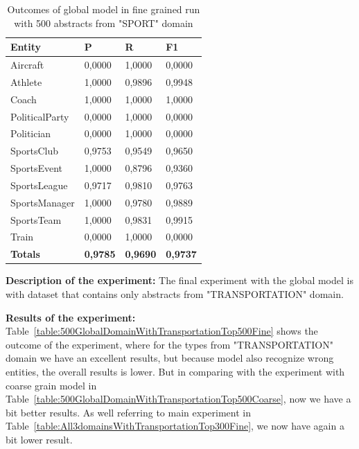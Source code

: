 \documentclass[thesis=M,english]{FITthesis}[2018/05/30]
\begin{document}
	\begin{table}[H]\centering
		\begin{tabular}{|l|l|l|l|}
			\hline {\textbf{Entity}} & {\textbf{P}} & {\textbf{R}} & {\textbf{F1}}\\\hline
				Aircraft & 0,0000 & 1,0000 & 0,0000\\
				Athlete & 1,0000 & 0,9896 & 0,9948\\
				Coach & 1,0000 & 1,0000 & 1,0000\\
				PoliticalParty & 0,0000 & 1,0000 & 0,0000\\
				Politician & 0,0000 & 1,0000 & 0,0000\\
				SportsClub & 0,9753 & 0,9549 & 0,9650\\
				SportsEvent & 1,0000 & 0,8796 & 0,9360\\
				SportsLeague & 0,9717 & 0,9810 & 0,9763\\
				SportsManager & 1,0000 & 0,9780 & 0,9889\\				
				SportsTeam & 1,0000 & 0,9831 & 0,9915\\
				Train & 0,0000 & 1,0000 & 0,0000\\\hline
				\textbf{Totals} & \textbf{0,9785} & \textbf{0,9690} & \textbf{0,9737}\\\hline
		\end{tabular}
		\caption{Outcomes of global model in fine grained run with 500 abstracts from "SPORT" domain \label{table:500GlobalDomainWithSportTop500Fine}}
	\end{table}	

	\textbf{Description of the experiment:} The final experiment with the global model is with dataset that contains only abstracts from "TRANSPORTATION" domain.

	\textbf{Results of the experiment:} Table~\ref{table:500GlobalDomainWithTransportationTop500Fine} shows the outcome of the experiment, where for the types from "TRANSPORTATION" domain we have an excellent results, but because model also recognize wrong entities, the overall results is lower. But in comparing with the experiment with coarse grain model in Table~\ref{table:500GlobalDomainWithTransportationTop500Coarse}, now we have a bit better results. As well referring to main experiment in Table~\ref{table:All3domainsWithTransportationTop300Fine}, we now have again a bit lower result.
\end{document}
